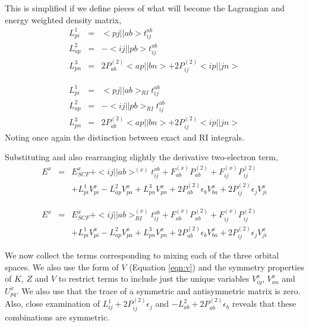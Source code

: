 \documentclass[fleqn,12pt]{article}
\newcommand{\bra}{<\!}
\newcommand{\ket}{\!>}
\newcommand{\tijab}{{t_{ij}^{ab}}}
\newcommand{\Ptwo}{P^{(2)}}
\newcommand{\Fx}{F^{(x)}}
\newcommand{\intari}[2]{\bra #1 || #2 \ket_{RI}}
\begin{document}
This is simplified if we define pieces of what will become the
Lagrangian and energy weighted density matrix,
\begin{eqnarray}
  L^1_{pi} & = & \bra pj || ab \ket \tijab \\
  L^2_{ap} & = & - \bra ij || pb \ket \tijab \\
  L^3_{pn} & = & 2 \Ptwo_{ab} \bra ap || bn \ket + 2 \Ptwo_{ij} \bra ip
  || jn \ket 
\end{eqnarray}
\begin{changebar}
\begin{eqnarray}
  L^1_{pi} & = & \intari{pj}{ab} \tijab \\
  L^2_{ap} & = & - \intari{ij}{pb} \tijab \\
  L^3_{pn} & = & 2 \Ptwo_{ab} \bra ap || bn \ket + 2 \Ptwo_{ij} \bra ip
  || jn \ket 
\end{eqnarray}
Noting once again the distinction between exact and RI integrals.
\end{changebar}
Substituting and also rearranging slightly the derivative two-electron
term,
\begin{eqnarray}
 E^x & = & E^x_{SCF} + \bra ij || ab \ket^{(x)} \tijab + \Fx_{ab} \Ptwo_{ab}
  + \Fx_{ij} \Ptwo_{ij} \\
 & & + L^1_{pi} V^x_{pi} - L^2_{ap} V^x_{pa} + L^3_{pn}V^x_{pn} +
 2 \Ptwo_{ab} \epsilon_b V^x_{ba} + 
   2 \Ptwo_{ij} \epsilon_j V^x_{ji} \label{eqn:deriv1}\nonumber
\end{eqnarray}
\begin{changebar}
\begin{eqnarray}
 E^x & = & E^x_{SCF} + \intari{ij}{ab}^{(x)} \tijab + \Fx_{ab} \Ptwo_{ab}
  + \Fx_{ij} \Ptwo_{ij} \\
 & & + L^1_{pi} V^x_{pi} - L^2_{ap} V^x_{pa} + L^3_{pn}V^x_{pn} +
 2 \Ptwo_{ab} \epsilon_b V^x_{ba} + 
   2 \Ptwo_{ij} \epsilon_j V^x_{ji} \label{eqn:deriv1-ri}\nonumber
\end{eqnarray}
\end{changebar}

We now collect the terms corresponding to mixing each of the three
orbital spaces.  We also use the form of $V$ (Equation \ref{eqn:v})
and the symmetry properties of $K$, $Z$ and $V$ to restrict terms to
include just the unique variables $V^x_{iy}$, $V^x_{an}$ and $U^x_{pq}$.
We also use that the trace of a symmetric and antisymmetric matrix is
zero.  Also, close examination of $L^1_{ij} + 2 \Ptwo_{ij} \epsilon_j$
and $-L^2_{ab} + 2 \Ptwo_{ab} \epsilon_b$ reveals that these
combinations are symmetric.
\end{document}

